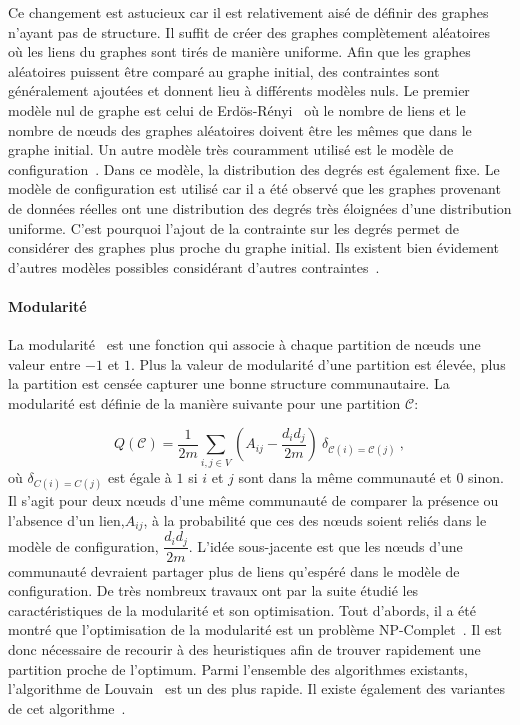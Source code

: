 Ce changement est astucieux car il est relativement aisé de définir des graphes n'ayant pas de structure.
Il suffit de créer des graphes complètement aléatoires~\cite{Erdos1959} où les liens du graphes sont tirés de manière uniforme.
Afin que les graphes aléatoires puissent être comparé au graphe initial, des contraintes sont généralement ajoutées et donnent lieu à différents modèles nuls.
Le premier modèle nul de graphe est celui de Erdös-Rényi~\cite{Erdos1959} où le nombre de liens et le nombre de n\oe uds des graphes aléatoires doivent être les mêmes que dans le graphe initial.
Un autre modèle très couramment utilisé est le modèle de configuration~\cite{Bender1978a}.
Dans ce modèle, la distribution des degrés est également fixe.
Le modèle de configuration est utilisé car il a été observé que les graphes provenant de données réelles ont une distribution des degrés très éloignées d'une distribution uniforme.
C'est pourquoi l'ajout de la contrainte sur les degrés permet de considérer des graphes plus proche du graphe initial. 
Ils existent bien évidement d'autres modèles possibles considérant d'autres contraintes~\cite{Newman2009}.

\paragraph{Modularité}
La modularité~\cite{Newman2004} est une fonction qui associe à chaque partition de n\oe uds une valeur entre $-1$ et $1$.
Plus la valeur de modularité d'une partition est élevée, plus la partition est censée capturer une bonne structure communautaire.
La modularité est définie de la manière suivante pour une partition $\mathcal{C}$:

\begin{equation}
Q(\mathcal{C}) = \dfrac{1}{2m}\sum_{i,j \in V} \left(A_{ij} - \dfrac{d_id_j}{2m}\right)\ \delta_{\mathcal{C}(i)=\mathcal{C}(j)} \ ,
\end{equation}
où $\delta_{C(i)=C(j)}$ est égale à $1$ si $i$ et $j$ sont dans la même communauté et $0$ sinon.
Il s'agit pour deux n\oe uds d'une même communauté de comparer la présence ou l'absence d'un lien,$A_{ij}$, à la probabilité que ces des n\oe uds soient reliés dans le modèle de configuration, $\dfrac{d_id_j}{2m}$.
L'idée sous-jacente est que les n\oe uds d'une communauté devraient partager plus de liens qu'espéré dans le modèle de configuration.
De très nombreux travaux ont par la suite étudié les caractéristiques de la modularité et son optimisation.
Tout d'abords, il a été montré que l'optimisation de la modularité est un problème NP-Complet~\cite{Brandes2007}.
Il est donc nécessaire de recourir à des heuristiques afin de trouver rapidement une partition proche de l'optimum.
Parmi l'ensemble des algorithmes existants, l'algorithme de Louvain~\cite{Blondel2008a} est un des plus rapide.
Il existe également des variantes de cet algorithme~\cite{Huang2015,Traag2015a}.

